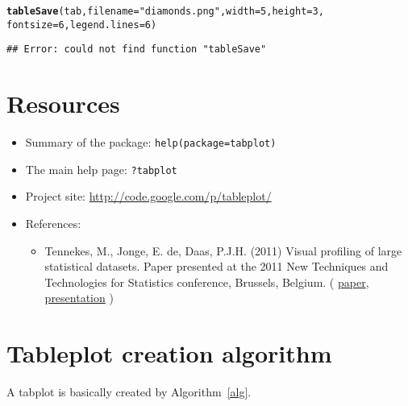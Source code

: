 \documentclass[11pt, fleqn, a4paper]{article}\usepackage{graphicx, color}
\makeatletter
\newcommand{\hlfunctioncall}[1]{\textcolor[rgb]{0.501960784313725,0,0.329411764705882}{\textbf{#1}}}%
\newcommand{\hlstring}[1]{\textcolor[rgb]{0.6,0.6,1}{#1}}%
\newenvironment{kframe}{%
 \def\FrameCommand##1{\hskip\@totalleftmargin \hskip-\fboxsep
 \colorbox{shadecolor}{##1}\hskip-\fboxsep
     \hskip-\linewidth \hskip-\@totalleftmargin \hskip\columnwidth}%
 \MakeFramed {\advance\hsize-\width
   \@totalleftmargin\z@ \linewidth\hsize
   \@setminipage}}%
 {\par\unskip\endMakeFramed}
\newenvironment{knitrout}{}{} %
\makeatother
\begin{document}
\begin{knitrout}
\color{fgcolor}\begin{kframe}
\begin{alltt}
\hlfunctioncall{tableSave}(tab, filename = \hlstring{"diamonds.png"}, width = 5, height = 3, 
    fontsize = 6, legend.lines = 6)
\end{alltt}
\begin{verbatim}
## Error: could not find function "tableSave"
\end{verbatim}
\end{kframe}
\end{knitrout}





\section{Resources}
\begin{itemize}
\item Summary of the package: {\tt help(package=tabplot)}
\item The main help page: {\tt ?tabplot}
\item Project site: \url{http://code.google.com/p/tableplot/}
\item References:
\begin{itemize}
\item Tennekes, M., Jonge, E. de, Daas, P.J.H. (2011) Visual profiling of large statistical datasets. Paper presented at the 2011 New Techniques and Technologies for Statistics conference, Brussels, Belgium. (
\href{http://www.von-tijn.nl/tijn/research/publications/Tableplots.pdf}{paper}, 
\href{http://www.von-tijn.nl/tijn/research/presentations/NTTS_tableplots.pdf}{presentation}
)
\end{itemize}
\end{itemize}


\appendix
\newpage
\section{Tableplot creation algorithm}\label{secalg}
A tabplot is basically created by Algorithm~\ref{alg}.
\end{document}
